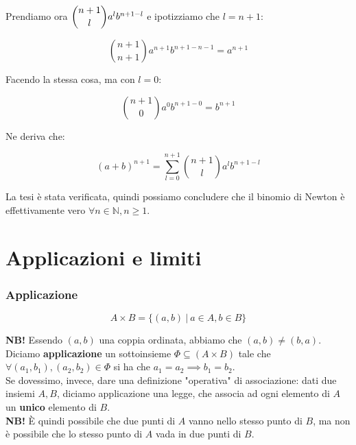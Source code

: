 \documentclass{article}
\begin{document}
\noindent Prendiamo ora $\dbinom{n+1}{l} a^l b^{n+1-l}$ e ipotizziamo che $l = n + 1$: 

\begin{equation*}
    \binom{n+1}{n+1} a^{n+1} b^{n+1-n-1} = a^{n+1}
\end{equation*}

\noindent Facendo la stessa cosa, ma con $l = 0$:

\begin{equation*}
    \binom{n+1}{0} a^0 b^{n+1-0} = b^{n+1}
\end{equation*}

\noindent Ne deriva che:

\begin{equation*}
    (a+b)^{n+1} = \sum_{l=0}^{n+1} \binom{n+1}{l} a^l b^{n+1-l}
\end{equation*}

\noindent La tesi è stata verificata, quindi possiamo concludere che il binomio di Newton è effettivamente vero $\forall n \in \mathbb{N}, n \geq 1$.
\newpage

\part{Applicazioni e limiti}
\section{Applicazione}
\begin{equation*}
    A \times B = \{ (a, b) \ | \ a \in A, b \in B \}
\end{equation*}

\noindent\textbf{NB!} Essendo $(a, b)$ una coppia ordinata, abbiamo che $(a, b) \neq (b, a)$. \\

\noindent Diciamo \textbf{applicazione} un sottoinsieme $\Phi \subseteq (A \times B)$ tale che $\forall (a_1, b_1), (a_2, b_2) \in \Phi$ si ha che $a_1 = a_2 \implies b_1 = b_2$. \\

\noindent Se dovessimo, invece, dare una definizione "operativa" di associazione: dati due insiemi $A, B$, diciamo applicazione una legge, che associa ad ogni elemento di $A$ un \textbf{unico} elemento di $B$.\\

\noindent \textbf{NB!} È quindi possibile che due punti di $A$ vanno nello stesso punto di $B$, ma non è possibile che lo stesso punto di $A$ vada in due punti di $B$. \\
\end{document}
